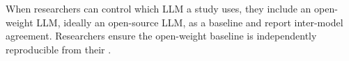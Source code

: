When researchers can control which LLM a study uses, they \should include an open-weight LLM, ideally an open-source LLM, as a baseline and report inter-model agreement. Researchers \should ensure the open-weight baseline is independently reproducible from their \supplementarymaterial.
